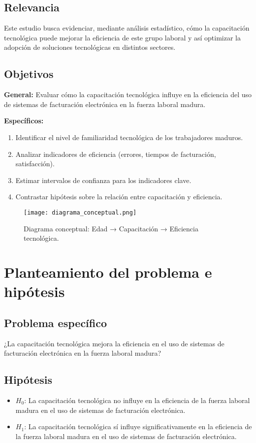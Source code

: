 \documentclass[12pt,a4paper]{report}
\begin{document}
\section*{Relevancia}
Este estudio busca evidenciar, mediante análisis estadístico, cómo la capacitación tecnológica puede mejorar la eficiencia de este grupo laboral y así optimizar la adopción de soluciones tecnológicas en distintos sectores.

\section*{Objetivos}
\textbf{General:} Evaluar cómo la capacitación tecnológica influye en la eficiencia del uso de sistemas de facturación electrónica en la fuerza laboral madura.

\textbf{Específicos:}
\begin{enumerate}
    \item Identificar el nivel de familiaridad tecnológica de los trabajadores maduros.
    \item Analizar indicadores de eficiencia (errores, tiempos de facturación, satisfacción).
    \item Estimar intervalos de confianza para los indicadores clave.
    \item Contrastar hipótesis sobre la relación entre capacitación y eficiencia.
\end{enumerate}

\begin{figure}[H]
    \centering
    \texttt{[image: diagrama\_conceptual.png]}
    \caption{Diagrama conceptual: Edad → Capacitación → Eficiencia tecnológica.}
\end{figure}

\chapter{Planteamiento del problema e hipótesis}

\section*{Problema específico}
¿La capacitación tecnológica mejora la eficiencia en el uso de sistemas de facturación electrónica en la fuerza laboral madura?

\section*{Hipótesis}
\begin{itemize}
    \item $H_{0}$: La capacitación tecnológica no influye en la eficiencia de la fuerza laboral madura en el uso de sistemas de facturación electrónica.
    \item $H_{1}$: La capacitación tecnológica sí influye significativamente en la eficiencia de la fuerza laboral madura en el uso de sistemas de facturación electrónica.
\end{itemize}
\end{document}

